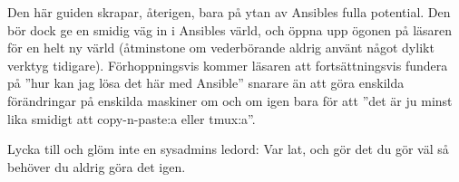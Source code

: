 Den här guiden skrapar, återigen, bara på ytan av Ansibles fulla potential. Den bör dock ge en smidig väg in i
Ansibles värld, och öppna upp ögonen på läsaren för en helt ny värld (åtminstone om vederbörande aldrig använt
något dylikt verktyg tidigare). Förhoppningsvis kommer läsaren att fortsättningsvis fundera på ''hur kan jag lösa
det här med Ansible'' snarare än att göra enskilda förändringar på enskilda maskiner om och om igen bara för att 
''det är ju minst lika smidigt att copy-n-paste:a eller tmux:a''.

Lycka till och glöm inte en sysadmins ledord: Var lat, och gör det du gör väl så behöver du aldrig göra det igen.

